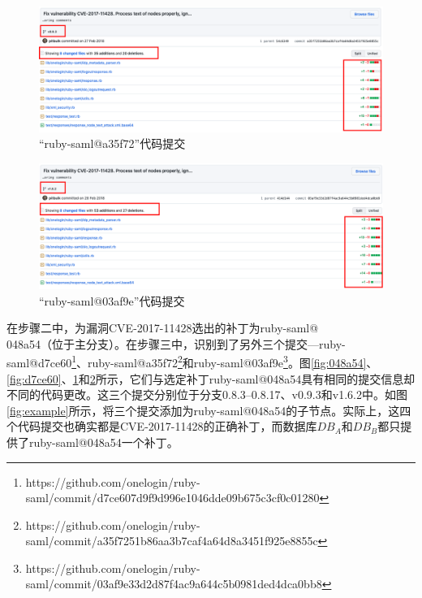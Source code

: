 \begin{figure}[!t]
    \centering
    \includegraphics[scale=0.30]{fig/11428-commit-a35f72}
    \caption{“ruby-saml@a35f72”代码提交}\label{fig:a35f72}
\end{figure}

\begin{figure}[!t]
    \centering
    \includegraphics[scale=0.30]{fig/11428-commit-03af9e}
    \caption{“ruby-saml@03af9e”代码提交}\label{fig:03af9e}
\end{figure}

\begin{exmp}
在步骤二中，\tool 为漏洞CVE-2017-11428选出的补丁为ruby-saml@\\048a54（位于主分支）。在步骤三中，\tool 识别到了另外三个提交---ruby-saml@d7ce60\footnote{https://github.com/onelogin/ruby-saml/commit/d7ce607d9f9d996e1046dde09b675c3cf0c01280}、ruby-saml@a35f72\footnote{https://github.com/onelogin/ruby-saml/commit/a35f7251b86aa3b7caf4a64d8a3451f925e8855c}和ruby-saml@03af9e\footnote{https://github.com/onelogin/ruby-saml/commit/03af9e33d2d87f4ac9a644c5b0981ded4dca0bb8}。图\ref{fig:048a54}、\ref{fig:d7ce60}、\ref{fig:a35f72}和\ref{fig:03af9e}所示，它们与选定补丁ruby-saml@048a54具有相同的提交信息却不同的代码更改。这三个提交分别位于分支0.8.3--0.8.17、v0.9.3和v1.6.2中。如图\ref{fig:example}所示，\tool 将三个提交添加为ruby-saml@048a54的子节点。实际上，这四个代码提交也确实都是CVE-2017-11428的正确补丁，而数据库$DB_A$和$DB_B$都只提供了ruby-saml@048a54一个补丁。
\end{exmp}

